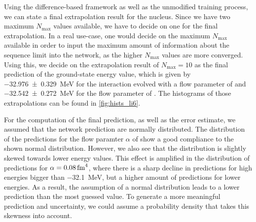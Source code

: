 Using the difference-based framework as well as the unmodified training process, we can state a final extrapolation result for the  nucleus. Since we have two maximum $N_\mathrm{max}$ values available, we have to decide on one for the final extrapolation. In a real use-case, one would decide on the maximum $N_\mathrm{max}$ available in order to input the maximum amount of information about the sequence limit into the network, as the higher $N_\mathrm{max}$ values are more converged. Using this, we decide on the extrapolation result of $N_\mathrm{max} = 10$ as the final prediction of the  ground-state energy value, which is given by \SI{-32.976 \pm 0.329}{\mega\electronvolt} for the interaction evolved with a flow parameter of  and \SI{-32.542 \pm 0.272}{\mega\electronvolt} for the flow parameter of . The histograms of those extrapolations can be found in \autoref{fig:hists_li6}.

For the computation of the final prediction, as well as the error estimate, we assumed that the network prediction are normally distributed. The distribution of the predictions for the flow paramter $\alpha$ of  show a good compliance to the shown normal distribution. However, we also see that the distribution is slightly skewed towards lower energy values. This effect is amplified in the distribution of predictions for $\alpha = \srg{0.08}$, where there is a sharp decline in predictions for high energies bigger than \SI{-32.1}{\mega\electronvolt}, but a higher amount of predictions for lower energies. As a result, the assumption of a normal distribution leads to a lower prediction than the most guessed value. To generate a more meaningful prediction and uncertainty, we could assume a probability density that takes this skewness into account.

